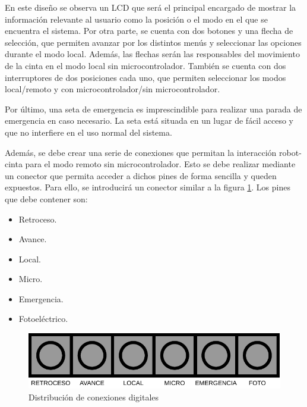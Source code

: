 En este diseño se observa un LCD que será el principal encargado de mostrar la información relevante al usuario como la posición o el modo en el que se encuentra el sistema. Por otra parte, se cuenta con dos botones y una flecha de selección, que permiten avanzar por los distintos menús y seleccionar las opciones durante el modo local. Además, las flechas serán las responsables del movimiento de la cinta en el modo local sin microcontrolador. También se cuenta con dos interruptores de dos posiciones cada uno, que permiten seleccionar los modos local/remoto y con microcontrolador/sin microcontrolador.

Por último, una seta de emergencia es imprescindible para realizar una parada de emergencia en caso necesario. La seta está situada en un lugar de fácil acceso y que no interfiere en el uso normal del sistema.

Además, se debe crear una serie de conexiones que permitan la interacción robot-cinta para el modo remoto sin microcontrolador. Esto se debe realizar mediante un conector que permita acceder a dichos pines de forma sencilla y queden expuestos. Para ello, se introducirá un conector similar a la figura \ref{fig:digitales}. Los pines que debe contener son:
\begin{itemize}
	\item Retroceso.
 	\item Avance.
	\item Local.
	\item Micro.
	\item Emergencia.
  	\item Fotoeléctrico.	
\end{itemize}

\begin{figure}[htbp]
	\centering
	\includegraphics[scale=0.75]{01-introduccion/DIGITALES.pdf}
	\caption{Distribución de conexiones digitales}
	\label{fig:digitales}
	\end{figure}
